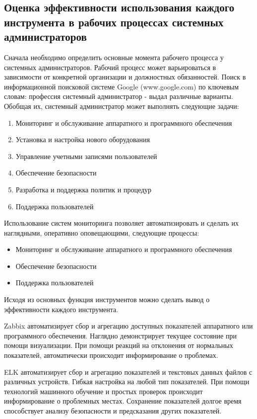 \subsection{Оценка эффективности использования каждого инструмента в рабочих процессах системных администраторов}

Сначала необходимо определить основные момента рабочего процесса у системных администраторов. 
Рабочий процесс может варьироваться в зависимости от конкретной организации и должностных обязанностей.
Поиск в информационной поисковой системе Google (www.google.com) по ключевым словам: профессия системный администратор
- выдал различные варианты. Обобщая их, системный администратор может выполнять следующие задачи:
\begin{enumerate}
    \item Мониторинг и обслуживание аппаратного и программного обеспечения
    \item Установка и настройка нового оборудования
    \item Управление учетными записями пользователей
    \item Обеспечение безопасности
    \item Разработка и поддержка политик и процедур
    \item Поддержка пользователей
\end{enumerate}

Использование систем мониторинга позволяет автоматизировать и сделать их наглядными, оперативно оповещающими, следующие процессы:
\begin{itemize}
    \item Мониторинг и обслуживание аппаратного и программного обеспечения
    \item Обеспечение безопасности
    \item Поддержка пользователей
\end{itemize}

Исходя из основных функция инструментов можно сделать вывод о эффективности каждого инструмента. 

Zabbix автоматизирует сбор и агрегацию доступных показателей аппаратного или программного обеспечения. Наглядно демонстрирует 
текущее состояние при помощи визуализации. При помощи реакций на отклонения от нормальных показателей, автоматически 
происходит информирование о проблемах.

ELK автоматизирует сбор и агрегацию показателей и текстовых данных файлов с различных устройств. Гибкая настройка на любой тип показателей.
При помощи технологий машинного обучение и простых проверок происходит информирование о проблемных местах. Сохранение
показателей долгое время способствует анализу безопасности и предсказания других показателей.

